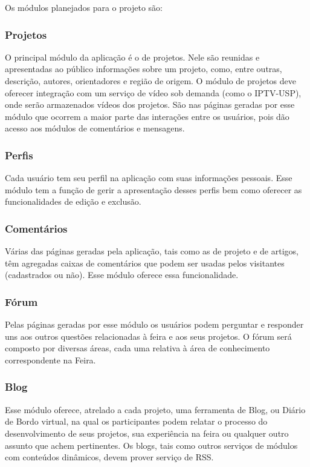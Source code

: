    Os módulos planejados para o projeto são:

    \subsubsection{Projetos}
      O principal módulo da aplicação é o de projetos. Nele são reunidas e apresentadas ao público informações sobre um projeto, como, entre outras, descrição, autores, orientadores e região de origem. O módulo de projetos deve oferecer integração com um serviço de vídeo sob demanda (como o IPTV-USP), onde serão armazenados vídeos dos projetos. São nas páginas geradas por esse módulo que ocorrem a maior parte das interações entre os usuários, pois dão acesso aos módulos de comentários e mensagens.

    \subsubsection{Perfis}
      Cada usuário tem seu perfil na aplicação com suas informações pessoais. Esse módulo tem a função de gerir a apresentação desses perfis bem como oferecer as funcionalidades de edição e exclusão.

    \subsubsection{Comentários}
      Várias das páginas geradas pela aplicação, tais como as de projeto e de artigos, têm agregadas caixas de comentários que podem ser usadas pelos visitantes (cadastrados ou não). Esse módulo oferece essa funcionalidade.

    \subsubsection{Fórum}
      Pelas páginas geradas por esse módulo os usuários podem perguntar e responder uns aos outros questões relacionadas à feira e aos seus projetos. O fórum será composto por diversas áreas, cada uma relativa à área de conhecimento correspondente na Feira.

    \subsubsection{Blog}
      Esse módulo oferece, atrelado a cada projeto, uma ferramenta de Blog, ou Diário de Bordo virtual, na qual os participantes podem relatar o processo do desenvolvimento de seus projetos, sua experiência na feira ou qualquer outro assunto que achem pertinentes. Os blogs, tais como outros serviços de módulos com conteúdos dinâmicos, devem prover serviço de RSS.

